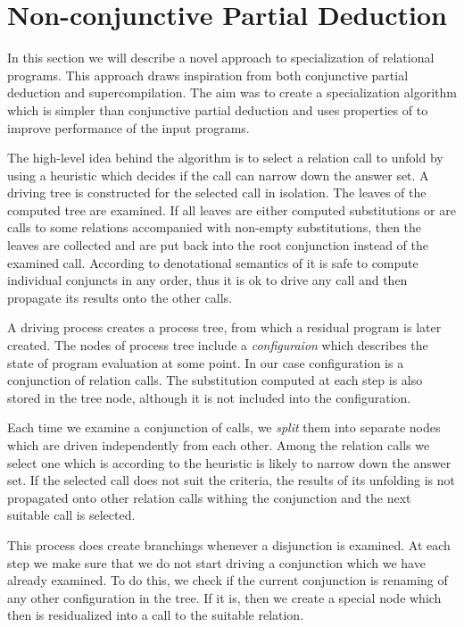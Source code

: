 \section{Non-conjunctive Partial Deduction}

In this section we will describe a novel approach to specialization of relational programs.
This approach draws inspiration from both conjunctive partial deduction and supercompilation.
The aim was to create a specialization algorithm which is simpler than conjunctive partial deduction and uses properties of \mk{} to improve performance of the input programs.

The high-level idea behind the algorithm is to select a relation call to unfold by using a heuristic which decides if the call can narrow down the answer set.
A driving tree is constructed for the selected call in isolation.
The leaves of the computed tree are examined.
If all leaves are either computed substitutions or are calls to some relations accompanied with non-empty substitutions, then the leaves are collected and are put back into the root conjunction instead of the examined call.
According to denotational semantics of \mk{} it is safe to compute individual conjuncts in any order, thus it is ok to drive any call and then propagate its results onto the other calls.

A driving process creates a process tree, from which a residual program is later created.
The nodes of process tree include a \emph{configuraion} which describes the state of program evaluation at some point.
In our case configuration is a conjunction of relation calls.
The substitution computed at each step is also stored in the tree node, although it is not included into the configuration.

Each time we examine a conjunction of calls, we \emph{split} them into separate nodes which are driven independently from each other.
Among the relation calls we select one which is according to the heuristic is likely to narrow down the answer set.
If the selected call does not suit the criteria, the results of its unfolding is not propagated onto other relation calls withing the conjunction and the next suitable call is selected.

This process does create branchings whenever a disjunction is examined.
At each step we make sure that we do not start driving a conjunction which we have already examined.
To do this, we check if the current conjunction is renaming of any other configuration in the tree.
If it is, then we create a special node which then is residualized into a call to the suitable relation.

